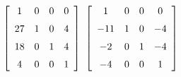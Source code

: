 {$\left[ \begin {array}{cccc} 1&0&0&0\\\noalign{\medskip}27&1&0&4
\\\noalign{\medskip}18&0&1&4\\\noalign{\medskip}4&0&0&1\end {array}
 \right]$ 
}
{$ \left[ \begin {array}{cccc} 1&0&0&0\\\noalign{\medskip}-11&1&0&-4
\\\noalign{\medskip}-2&0&1&-4\\\noalign{\medskip}-4&0&0&1\end {array}
 \right] $}
